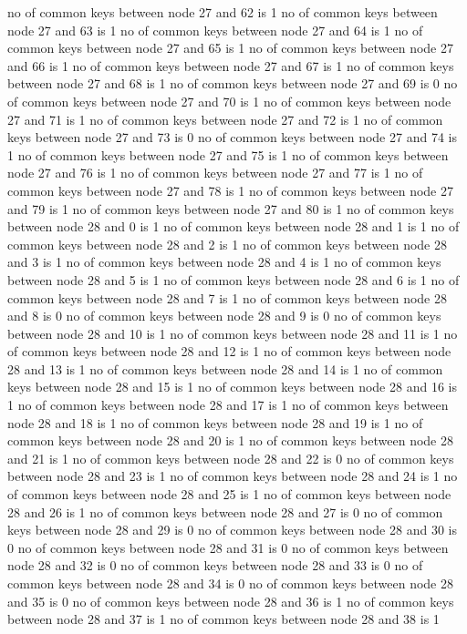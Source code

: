 no of common keys between node 27 and 62 is 1
no of common keys between node 27 and 63 is 1
no of common keys between node 27 and 64 is 1
no of common keys between node 27 and 65 is 1
no of common keys between node 27 and 66 is 1
no of common keys between node 27 and 67 is 1
no of common keys between node 27 and 68 is 1
no of common keys between node 27 and 69 is 0
no of common keys between node 27 and 70 is 1
no of common keys between node 27 and 71 is 1
no of common keys between node 27 and 72 is 1
no of common keys between node 27 and 73 is 0
no of common keys between node 27 and 74 is 1
no of common keys between node 27 and 75 is 1
no of common keys between node 27 and 76 is 1
no of common keys between node 27 and 77 is 1
no of common keys between node 27 and 78 is 1
no of common keys between node 27 and 79 is 1
no of common keys between node 27 and 80 is 1
no of common keys between node 28 and 0 is 1
no of common keys between node 28 and 1 is 1
no of common keys between node 28 and 2 is 1
no of common keys between node 28 and 3 is 1
no of common keys between node 28 and 4 is 1
no of common keys between node 28 and 5 is 1
no of common keys between node 28 and 6 is 1
no of common keys between node 28 and 7 is 1
no of common keys between node 28 and 8 is 0
no of common keys between node 28 and 9 is 0
no of common keys between node 28 and 10 is 1
no of common keys between node 28 and 11 is 1
no of common keys between node 28 and 12 is 1
no of common keys between node 28 and 13 is 1
no of common keys between node 28 and 14 is 1
no of common keys between node 28 and 15 is 1
no of common keys between node 28 and 16 is 1
no of common keys between node 28 and 17 is 1
no of common keys between node 28 and 18 is 1
no of common keys between node 28 and 19 is 1
no of common keys between node 28 and 20 is 1
no of common keys between node 28 and 21 is 1
no of common keys between node 28 and 22 is 0
no of common keys between node 28 and 23 is 1
no of common keys between node 28 and 24 is 1
no of common keys between node 28 and 25 is 1
no of common keys between node 28 and 26 is 1
no of common keys between node 28 and 27 is 0
no of common keys between node 28 and 29 is 0
no of common keys between node 28 and 30 is 0
no of common keys between node 28 and 31 is 0
no of common keys between node 28 and 32 is 0
no of common keys between node 28 and 33 is 0
no of common keys between node 28 and 34 is 0
no of common keys between node 28 and 35 is 0
no of common keys between node 28 and 36 is 1
no of common keys between node 28 and 37 is 1
no of common keys between node 28 and 38 is 1
